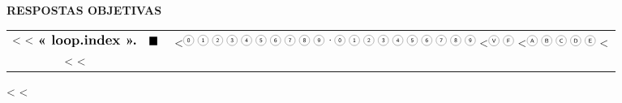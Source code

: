 \documentclass[addpoints, 12pt]{exam}
\begin{document}
\begin{center}
    \textbf{\Large RESPOSTAS OBJETIVAS} \\ \vspace{0.4cm}
    \renewcommand{\arraystretch}{2} %
    
    \begin{tabular}{c c l}
        <%
        <%
            $\vcenter{\hbox{\textbf{\large << loop.index >>.}}}$ & 
            $\vcenter{\hbox{\rule{0.25cm}{0.25cm}}}$ & 
            $\vcenter{\hbox{
            <%
                \begin{tikzpicture}
                    \foreach \n in {0,...,9} { 
                        \draw[black!50, thin] (0.45*\n, 0) circle (0.16) node[text=black] {\sffamily\fontsize{5}{6}\selectfont \n}; 
                    }
                    \node at (4.4, 0) {\small $\cdot$};
                    \foreach \n in {0,...,9} { 
                        \draw[black!50, thin] (4.7 + 0.45*\n, 0) circle (0.16) node[text=black] {\sffamily\fontsize{5}{6}\selectfont \n}; 
                    }
                \end{tikzpicture}
            <%
                \begin{tikzpicture}
                    \draw[black!50, thin] (0, 0) circle (0.16) node[text=black] {\sffamily\fontsize{5}{6}\selectfont V};
                    \draw[black!50, thin] (0.45, 0) circle (0.16) node[text=black] {\sffamily\fontsize{5}{6}\selectfont F};
                \end{tikzpicture}
            <%
                \begin{tikzpicture}
                    \foreach \l [count=\i from 0] in {A,B,C,D,E} {
                        \draw[black!50, thin] (0.45*\i, 0) circle (0.16) node[text=black] {\sffamily\fontsize{5}{6}\selectfont \l};
                    }
                \end{tikzpicture}
            <%
            }}$ \\
        <%
        <%
    \end{tabular}
\end{center}

<%
<%
\end{document}
